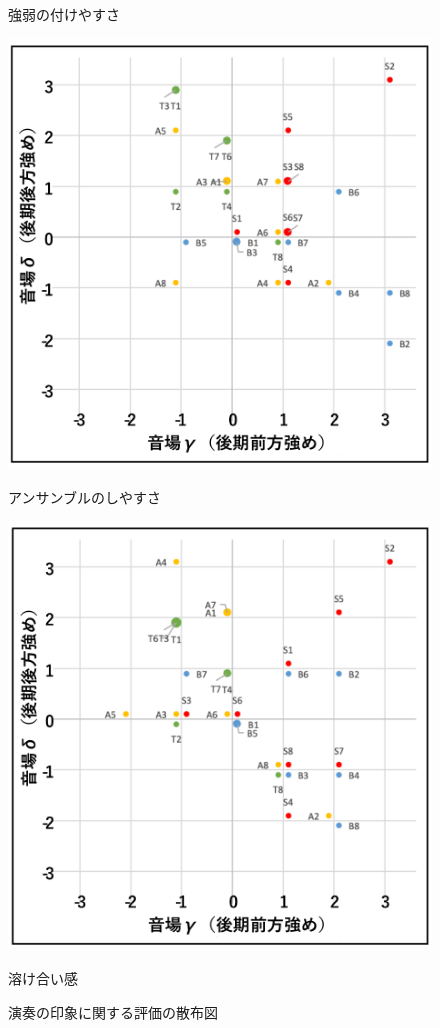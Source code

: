 \documentclass[11pt,a4j]{jreport}
\begin{document}
\begin{figure}[H]
\begin{minipage}{0.5\linewidth}
    \caption*{強弱の付けやすさ}
  \end{minipage}
  \begin{minipage}{.5\linewidth}
    \centering
    \includegraphics[width=.9\linewidth]{images/subjectiveExp/scat_late_10ensemble.pdf}
    \caption*{アンサンブルのしやすさ}
  \end{minipage}%
  \begin{minipage}{.5\linewidth}
    \centering
    \includegraphics[width=.9\linewidth]{images/subjectiveExp/scat_late_11notConflict.pdf}
    \caption*{溶け合い感}
  \end{minipage}

  \caption{演奏の印象に関する評価の散布図}
  \label{fig:演奏の印象に関する評価の散布図}
\end{figure}
\end{document}
